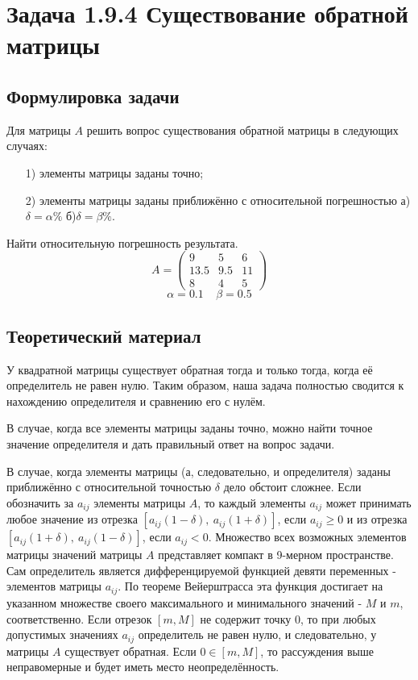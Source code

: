 \documentclass[12pt]{article}%
\begin{document}
\section{Задача 1.9.4 Существование обратной матрицы}
\subsection{Формулировка задачи}
Для матрицы $A$ решить вопрос существования обратной матрицы в следующих случаях:
\begin{enumerate}
    \item[1)] элементы матрицы заданы точно;
    \item[2)] элементы матрицы заданы приближённо с относительной погрешностью а)$\delta = \alpha \%$  б)$\delta = \beta \%$.
\end{enumerate}
Найти относительную погрешность результата.
\begin{equation*}
    A = \begin{pmatrix}
        9 & 5 & 6 \\
        13.5 & 9.5 & 11 \\
        8    & 4   & 5
    \end{pmatrix}
\end{equation*}
\begin{equation*}
    \alpha = 0.1\ \ \ \ \ \beta = 0.5
\end{equation*}

\subsection{Теоретический материал}
У квадратной матрицы существует обратная тогда и только тогда, когда её определитель не равен нулю. Таким образом, наша задача полностью сводится к нахождению определителя и сравнению его с нулём.

В случае, когда все элементы матрицы заданы точно, можно найти точное значение определителя и дать правильный ответ на вопрос задачи.

В случае, когда элементы матрицы (а, следовательно, и определителя) заданы приближённо с относительной точностью $\delta$ дело обстоит сложнее. Если обозначить за $a_{ij}$ элементы матрицы $A$, то каждый элементы $a_{ij}$ может принимать любое значение из отрезка 
$[a_{ij}(1 - \delta),\ a_{ij}(1 + \delta )]$,
если $a_{ij} \geqslant 0$ и из отрезка
$[a_{ij}(1 + \delta),\ a_{ij}(1 - \delta )]$,
если $a_{ij} < 0$. Множество всех возможных элементов матрицы значений матрицы $A$ представляет компакт в 9-мерном пространстве. Сам определитель является дифференцируемой функцией девяти переменных - элементов матрицы $a_{ij}$. По теореме Вейерштрасса эта функция достигает на указанном множестве своего максимального и минимального значений - $M$ и $m$, соответственно. Если отрезок $[m, M]$ не содержит точку 0, то при любых допустимых значениях $a_{ij}$ определитель не равен нулю, и следовательно, у матрицы $A$ существует обратная. Если $0 \in [m, M]$, то рассуждения выше неправомерные и будет иметь место неопределённость.
\end{document}
